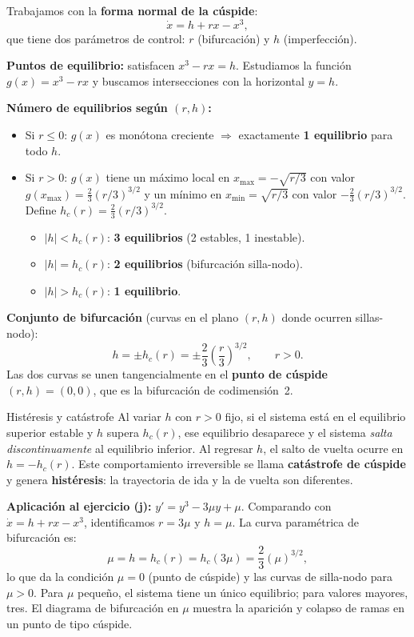\documentclass[11pt,letterpaper]{article}
\begin{document}
Trabajamos con la \textbf{forma normal de la cúspide}:
\[
\dot{x} = h + rx - x^3,
\]
que tiene dos parámetros de control: $r$ (bifurcación) y $h$ (imperfección).

\textbf{Puntos de equilibrio:} satisfacen $x^3-rx=h$. Estudiamos la función
$g(x)=x^3-rx$ y buscamos intersecciones con la horizontal $y=h$.

\textbf{Número de equilibrios según $(r,h)$:}
\begin{itemize}
    \item Si $r\leq 0$: $g(x)$ es monótona creciente $\Rightarrow$ exactamente
          \textbf{1 equilibrio} para todo $h$.
    \item Si $r>0$: $g(x)$ tiene un máximo local en $x_{\max}=-\sqrt{r/3}$
          con valor $g(x_{\max})=\frac{2}{3}(r/3)^{3/2}$ y un mínimo en
          $x_{\min}=\sqrt{r/3}$ con valor $-\frac{2}{3}(r/3)^{3/2}$.
          Define $h_c(r)=\frac{2}{3}(r/3)^{3/2}$.
          \begin{itemize}
              \item $|h|<h_c(r)$: \textbf{3 equilibrios} (2 estables, 1 inestable).
              \item $|h|=h_c(r)$: \textbf{2 equilibrios} (bifurcación silla-nodo).
              \item $|h|>h_c(r)$: \textbf{1 equilibrio}.
          \end{itemize}
\end{itemize}

\textbf{Conjunto de bifurcación} (curvas en el plano $(r,h)$ donde ocurren
sillas-nodo):
\[
h = \pm h_c(r) = \pm\frac{2}{3}\left(\frac{r}{3}\right)^{3/2},\qquad r>0.
\]
Las dos curvas se unen tangencialmente en el \textbf{punto de cúspide}
$(r,h)=(0,0)$, que es la bifurcación de codimensión~2.

\begin{observacion}{Histéresis y catástrofe}{}
Al variar $h$ con $r>0$ fijo, si el sistema está en el equilibrio superior
estable y $h$ supera $h_c(r)$, ese equilibrio desaparece y el sistema
\emph{salta discontinuamente} al equilibrio inferior.
Al regresar $h$, el salto de vuelta ocurre en $h=-h_c(r)$.
Este comportamiento irreversible se llama \textbf{catástrofe de cúspide}
y genera \textbf{histéresis}: la trayectoria de ida y la de vuelta son diferentes.
\end{observacion}

\textbf{Aplicación al ejercicio (j):} $y'=y^3-3\mu y+\mu$.
Comparando con $\dot x=h+rx-x^3$, identificamos $r=3\mu$ y $h=\mu$.
La curva paramétrica de bifurcación es:
\[
\mu=h=h_c(r)=h_c(3\mu)=\frac{2}{3}\left(\mu\right)^{3/2},
\]
lo que da la condición $\mu=0$ (punto de cúspide) y las curvas de silla-nodo
para $\mu>0$. Para $\mu$ pequeño, el sistema tiene un único equilibrio;
para valores mayores, tres. El diagrama de bifurcación en $\mu$ muestra
la aparición y colapso de ramas en un punto de tipo cúspide.
\end{document}
